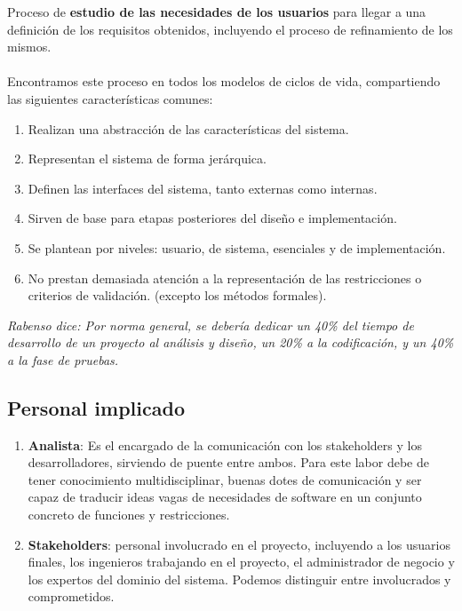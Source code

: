 Proceso de \textbf{estudio de las necesidades de los usuarios} para llegar a una definición de los requisitos obtenidos, incluyendo el proceso de refinamiento de los mismos.
\\\\
Encontramos este proceso en todos los modelos de ciclos de vida, compartiendo las siguientes características comunes:
\begin{enumerate}
    \item Realizan una abstracción de las características del sistema.
    \item Representan el sistema de forma jerárquica.
    \item Definen las interfaces del sistema, tanto externas como internas. %
    \item Sirven de base para etapas posteriores del diseño e implementación.
    \item Se plantean por niveles: usuario, de sistema, esenciales y de implementación.
    \item No prestan demasiada atención a la representación de las restricciones o criterios de validación. (excepto los métodos formales).
\end{enumerate}

\textit{Rabenso dice: Por norma general, se debería dedicar un 40\% del tiempo de desarrollo de un proyecto al análisis y diseño, un 20\% a la codificación, y un 40\% a la fase de pruebas.}

\subsection{Personal implicado}

\begin{enumerate}
    \item \textbf{Analista}: Es el encargado de la comunicación con los stakeholders y los desarrolladores, sirviendo de puente entre ambos. Para este labor debe de tener conocimiento multidisciplinar, buenas dotes de comunicación y ser capaz de traducir ideas vagas de necesidades de software en un conjunto concreto de funciones y restricciones.

    \item \textbf{Stakeholders}: personal involucrado en el proyecto, incluyendo a los usuarios finales, los ingenieros trabajando en el proyecto, el administrador de negocio y los expertos del dominio del sistema. Podemos distinguir entre involucrados y comprometidos.
\end{enumerate}


